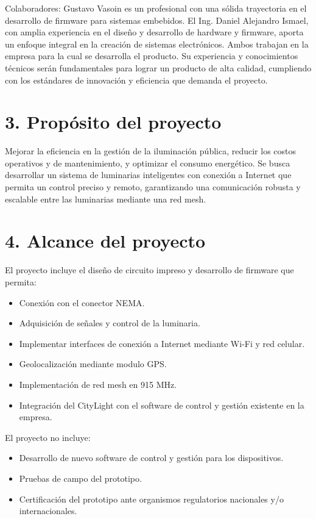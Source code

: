 \documentclass[
11pt, %
]{charter}
\begin{document}
Colaboradores: Gustavo Vasoin es un profesional con una sólida trayectoria en el desarrollo de firmware para sistemas embebidos. El Ing. Daniel Alejandro Ismael, con amplia experiencia en el  diseño y desarrollo de hardware y firmware, aporta un enfoque integral en la creación de sistemas electrónicos. Ambos trabajan en la empresa para la cual se desarrolla el producto. Su experiencia y conocimientos técnicos serán fundamentales para lograr un producto de alta calidad, cumpliendo con los estándares de innovación y eficiencia que demanda el proyecto.

\section{3. Propósito del proyecto}
\label{sec:proposito}

Mejorar la eficiencia en la gestión de la iluminación pública, reducir los costos operativos y de mantenimiento, y optimizar el consumo energético. Se busca desarrollar un sistema de luminarias inteligentes con conexión a Internet que permita un control preciso y remoto, garantizando una comunicación robusta y escalable entre las luminarias mediante una red mesh.

\section{4. Alcance del proyecto}
\label{sec:alcance}

El proyecto incluye el diseño de circuito impreso y desarrollo de firmware que permita:
\begin{itemize}
	\item Conexión con el conector NEMA.
	\item Adquisición de señales y control de la luminaria.
	\item Implementar interfaces de conexión a Internet mediante Wi-Fi y red celular.
	\item Geolocalización mediante modulo GPS.
	\item Implementación de red mesh en 915 MHz.
	\item Integración del CityLight con el software de control y gestión existente en la empresa.
\end{itemize}	

El proyecto no incluye:
\begin{itemize}
	\item Desarrollo de nuevo software de control y gestión para los dispositivos.
	\item Pruebas de campo del prototipo.
	\item Certificación del prototipo ante organismos regulatorios nacionales y/o internacionales.
\end{itemize}
\end{document}
